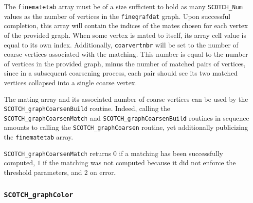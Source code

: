 \begin{itemize}
The {\tt finematetab} array must be of a size sufficient to hold as
many {\tt SCOTCH\_\lbt Num} values as the number of vertices in the
{\tt fine\lbt graf\lbt dat} graph. Upon successful completion, this
array will contain the indices of the mates chosen for each vertex of
the provided graph. When some vertex is mated to itself, its array
cell value is equal to its own index. Additionally, {\tt coarvertnbr}
will be set to the number of coarse vertices associated with the
matching. This number is equal to the number of vertices in the
provided graph, minus the number of matched pairs of vertices,
since in a subsequent coarsening process, each pair should see its two
matched vertices collapsed into a single coarse vertex.

The mating array and its associated number of coarse vertices can be
used by the {\tt SCOTCH\_\lbt graph\lbt Coarsen\lbt Build} routine.
Indeed, calling the {\tt SCOTCH\_\lbt graph\lbt Coarsen\lbt Match} and
{\tt SCOTCH\_\lbt graph\lbt Coarsen\lbt Build} routines in sequence
amounts to calling the {\tt SCOTCH\_\lbt graph\lbt Coarsen} routine,
yet additionally publicizing the {\tt fine\lbt mate\lbt tab} array.

\progret

{\tt SCOTCH\_graphCoarsenMatch} returns $0$ if a matching has been
successfully computed, $1$ if the matching was not computed because it
did not enforce the threshold parameters, and $2$ on error.
\end{itemize}

\subsubsection{{\tt SCOTCH\_graphColor}}

